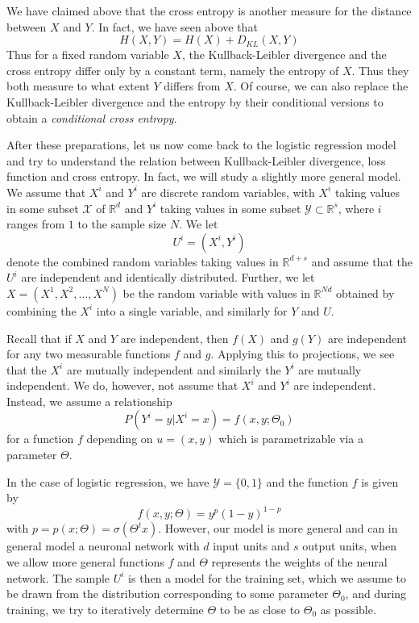 \documentclass[a4paper, draft]{report}
\numberwithin{section}{chapter}
\numberwithin{equation}{chapter}
\theoremstyle{own}
\theoremstyle{remark}
\newcommand{\R}{\mathbb{R}}
\begin{document}
We have claimed above that the cross entropy is another measure for the distance between $X$ and $Y$. In fact, we have seen above that
$$
H(X,Y) = H(X) + D_{KL}(X,Y)
$$
Thus for a fixed random variable $X$, the Kullback-Leibler divergence and the cross entropy differ only by a constant term, namely the entropy of $X$. Thus they both measure to what extent $Y$ differs from $X$. Of course, we can also replace the Kullback-Leibler divergence and the entropy by their conditional versions to obtain a {\em conditional cross entropy}.

After these preparations, let us now come back to the logistic regression model and try to understand the relation between Kullback-Leibler divergence, loss function and cross entropy. In fact, we will study a slightly more general model. We assume that $X^i$ and $Y^i$ are discrete random variables, with $X^i$ taking values in some subset ${\mathcal X}$ of $\R^d$ and $Y^i$ taking values in some subset ${\mathcal Y} \subset \R^s$, where $i$ ranges from $1$ to the sample size $N$. We let 
$$
U^i  = (X^i,Y^i)
$$
denote the combined random variables taking values in $\R^{d+s}$ and assume that the $U^i$ are independent and identically distributed. Further, we let $X = (X^1, X^2, \dots, X^N)$ be the random variable with values in $\R^{Nd}$ obtained by combining the $X^i$ into a single variable,
and similarly for $Y$ and $U$.

Recall that if $X$ and $Y$ are independent, then $f(X)$ and $g(Y)$ are independent for any two measurable functions $f$ and $g$. Applying this to projections, we see that the $X^i$ are mutually independent and similarly the $Y^i$ are mutually independent. We do, however, not assume
that $X^i$ and $Y^i$ are independent. Instead, we assume a relationship
$$
P(Y^i = y | X^i = x) = f(x,y ; \Theta_0)
$$
for a function $f$ depending on $u = (x,y)$ which is parametrizable via a parameter $\Theta$. 

In the case of logistic regression, we have ${\mathcal Y} = \{0,1\}$ and the function $f$ is given by
$$
f(x,y; \Theta) = y^p (1-y)^{1-p}
$$
with $p = p(x; \Theta) = \sigma(\Theta^t x)$. However, our model is more general and can in general model a neuronal network with $d$ input units and $s$ output units, when we allow more general functions $f$ and $\Theta$ represents the weights of the neural network. The sample $U^i$ is then a model for the training set, which we assume to be drawn from the distribution corresponding to some parameter $\Theta_0$, and during training, we try to iteratively determine $\Theta$ to be as close to $\Theta_0$ as possible. 
\end{document}
